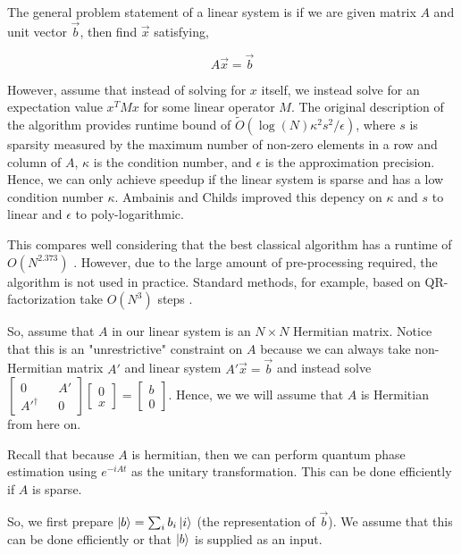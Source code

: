 \documentclass[12]{amsart}
\newcommand\0{\mathbf{0}}
\newcommand\<{\langle}
\renewcommand\>{\rangle}
\begin{document}
The general problem statement of a linear system is if we are given matrix $A$ and unit vector $\vec{b}$, then find $\vec{x}$ satisfying, 

$$A\vec{x} = \vec{b}$$ 

However, assume that instead of solving for $x$ itself, we instead solve for an expectation value $x^T M x$ for some linear operator $M$. The original description of the algorithm provides runtime bound of $\tilde{O}(\log(N)\kappa ^{2} s^2 / \epsilon)$, where $s$ is sparsity measured by the maximum number of non-zero elements in a row and column of $A$, $\kappa$ is the condition number, and $\epsilon$ is the approximation precision. Hence, we can only achieve speedup if the linear system is sparse and has a low condition number $\kappa$. Ambainis \cite{ambainis2012variable} and Childs \cite{childs2015quantum} improved this depency on $\kappa$ and $s$ to linear and $\epsilon$ to poly-logarithmic.

This compares well considering that the best classical algorithm has a runtime of $O(N^{2.373})$ \cite{coppersmith1987matrix}. However, due to the large amount of pre-processing required, the algorithm is not used in practice. Standard methods, for example, based on QR-factorization take $O(N^3)$ steps \cite{golub2012matrix}. 

So, assume that $A$ in our linear system is an $N \times N$ Hermitian matrix. Notice that this is an "unrestrictive" constraint on $A$ because we can always take non-Hermitian matrix $A'$ and linear system $A' \vec{x} = \vec{b}$ and instead solve $\begin{bmatrix}
	0 && A' \\ A'^\dag && 0
\end{bmatrix} \begin{bmatrix} 0 \\ x \end{bmatrix} = \begin{bmatrix} b \\ 0 \end{bmatrix}$. Hence, we we will assume that $A$ is Hermitian from here on. 

Recall that because $A$ is hermitian, then we can perform quantum phase estimation using $e^{-iAt}$ as the unitary transformation. This can be done efficiently if $A$ is sparse.

So, we first prepare $\ket{b} = \sum_i b_i \ket{i}$ (the representation of $\vec{b}$). We assume that this can be done efficiently or that $\ket{b}$ is supplied as an input.
\end{document}
